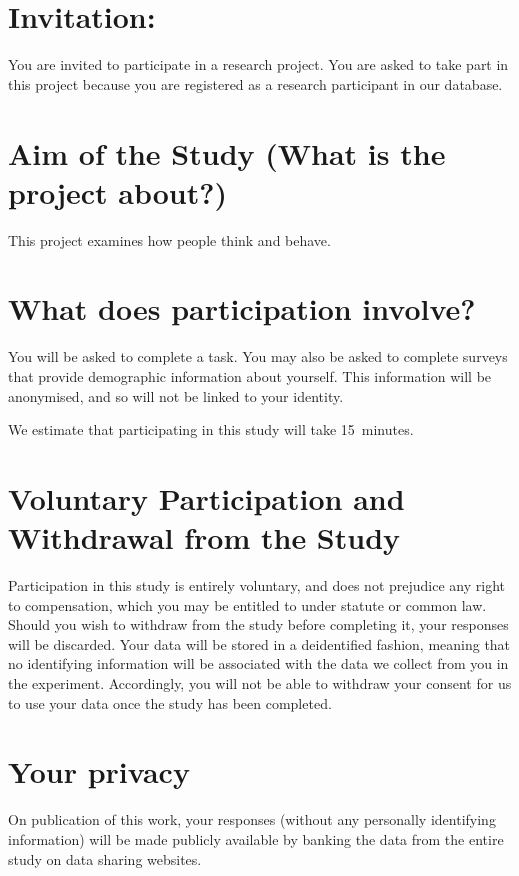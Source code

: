 \documentclass{uwa-pif}
\author{John Smith}
\begin{document}
\section{Invitation:}

You are invited to participate in a research project. You are asked
to take part in this project because you are registered as a research
participant in our database.

\section{Aim of the Study (What is the project about?)}

This project examines how people think and behave.

\section{What does participation involve?}

You will be asked to complete a task. You may also be asked to complete
surveys that provide demographic information about yourself. This information
will be anonymised, and so will not be linked to your identity.

We estimate that participating in this study will take 15~minutes.

\section{Voluntary Participation and Withdrawal from the Study}

Participation in this study is entirely voluntary, and does not
prejudice any right to compensation, which you may be entitled to
under statute or common law. Should you wish to withdraw from the study
before completing it, your responses will be discarded. Your data will
be stored in a deidentified fashion, meaning that no identifying information
will be associated with the data we collect from you in the experiment.
Accordingly, you will not be able to withdraw your consent for us to
use your data once the study has been completed.

\section{Your privacy}

On publication of this work, your responses (without any personally
identifying information) will be made publicly available by banking
the data from the entire study on data sharing websites.
\end{document}
